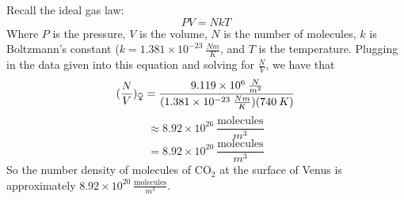 \documentclass{article}
\begin{document}
\begin{enumerate}
    Recall the ideal gas law:
    \begin{equation}
        PV = NkT
    \end{equation}
    Where $P$ is the pressure, $V$ is the volume, $N$ is the number of molecules, $k$ is Boltzmann's constant ($k = 1.381 \times 10^{-23} \: \frac{Nm}{K}$, and $T$ is the temperature. Plugging in the data given into this equation and solving for $\frac{N}{V}$, we have that 
    \[(\frac{N}{V})_{\venus} = \frac{9.119 \times 10^6 \: \frac{N}{m^2}}{(1.381 \times 10^{-23} \: \frac{Nm}{K})(740 \:K)}\]
    \[\approx 8.92 \times 10^{26} \: \frac{\text{molecules}}{m^3}\]
    \[ = 8.92 \times 10^{20} \: \frac{\text{molecules}}{m^3}\]
    So the number density of molecules of CO$_2$ at the surface of Venus is approximately $8.92 \times 10^{20} \: \frac{\text{molecules}}{m^3}$.
\end{enumerate}
\end{document}
